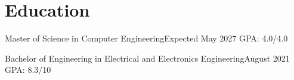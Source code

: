 \section*{Education}
      {Master of Science in Computer Engineering}{Expected May 2027 \enspace\textbar\enspace GPA: 4.0/4.0}
\vspace{4pt}

      {Bachelor of Engineering in Electrical and Electronics Engineering}{August 2021 \enspace\textbar\enspace GPA: 8.3/10}
